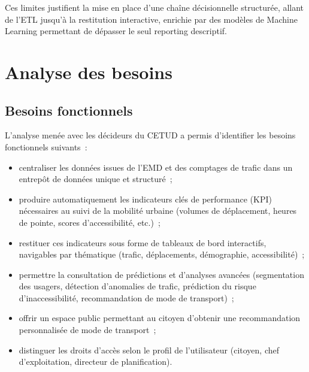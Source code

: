 Ces limites justifient la mise en place d'une chaîne décisionnelle structurée, allant de l'ETL jusqu'à la restitution interactive, enrichie par des modèles de Machine Learning permettant de dépasser le seul reporting descriptif.

\section{Analyse des besoins}

\subsection{Besoins fonctionnels}
L'analyse menée avec les décideurs du CETUD a permis d'identifier les besoins fonctionnels suivants~:
\begin{itemize}
\item centraliser les données issues de l'EMD et des comptages de trafic dans un entrepôt de données unique et structuré~;
\item produire automatiquement les indicateurs clés de performance (KPI) nécessaires au suivi de la mobilité urbaine (volumes de déplacement, heures de pointe, scores d'accessibilité, etc.)~;
\item restituer ces indicateurs sous forme de tableaux de bord interactifs, navigables par thématique (trafic, déplacements, démographie, accessibilité)~;
\item permettre la consultation de prédictions et d'analyses avancées (segmentation des usagers, détection d'anomalies de trafic, prédiction du risque d'inaccessibilité, recommandation de mode de transport)~;
\item offrir un espace public permettant au citoyen d'obtenir une recommandation personnalisée de mode de transport~;
\item distinguer les droits d'accès selon le profil de l'utilisateur (citoyen, chef d'exploitation, directeur de planification).
\end{itemize}

